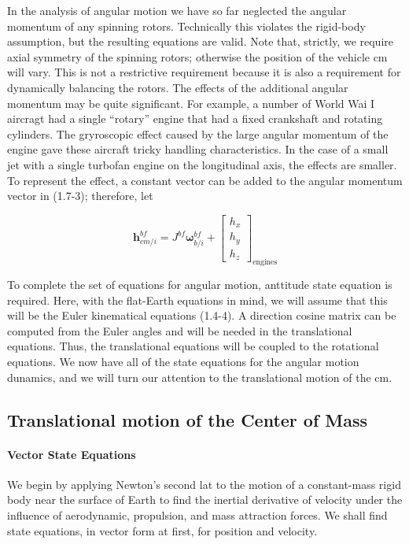 In the analysis of angular motion we have so far neglected the angular momentum of any spinning rotors. Technically this violates the rigid-body assumption, but the resulting equations are valid. Note that, strictly, we require axial symmetry of the spinning rotors; otherwise the position of the vehicle cm will vary. This is not a restrictive requirement because it is also a requirement for dynamically balancing the rotors. The effects of the additional angular momentum may be quite significant. For example, a number of World Wai I aircragt had a single ``rotary'' engine that had a fixed crankshaft and rotating cylinders. The gryroscopic effect caused by the large angular momentum of the engine gave these aircraft tricky handling characteristics. In the case of a small jet with a single turbofan engine on the longitudinal axis, the effects are smaller. To represent the effect, a constant vector can be added to the angular momentum vector in (1.7-3); therefore, let

\begin{equation*}\tag{1.7-11a}
    \mathbf{h}^{bf}_{cm/i} = J^{bf} \mathbf{\omega}^{bf}_{b/i} + {{\begin{bmatrix} h_{x} \\ h_{y} \\ h_{z}\end{bmatrix}}_{\text{engines}}}
\end{equation*}

To complete the set of equations for angular motion, anttitude state equation is required. Here, with the flat-Earth equations in mind, we will assume that this will be the Euler kinematical equations (1.4-4). A direction cosine matrix can be computed from the Euler angles and will be needed in the translational equations. Thus, the translational equations will be coupled to the rotational equations. We now have all of the state equations for the angular motion dunamics, and we will turn our attention to the translational motion of the cm.

\subsection{Translational motion of the Center of Mass}

\paragraph{Vector State Equations}
We begin by applying Newton's second lat to the motion of a constant-mass rigid body near the surface of Earth to find the inertial derivative of velocity under the influence of aerodynamic, propulsion, and mass attraction forces. We shall find state equations, in vector form at first, for position and velocity.


